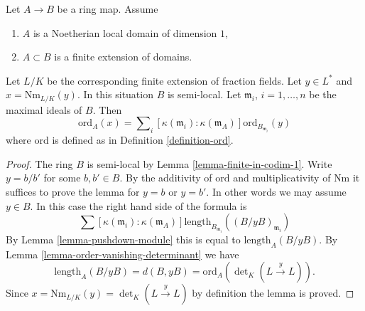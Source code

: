 \begin{lemma}
\label{lemma-finite-extension-dim-1}
Let $A \to B$ be a ring map. Assume
\begin{enumerate}
\item $A$ is a Noetherian local domain of dimension $1$,
\item $A \subset B$ is a finite extension of domains.
\end{enumerate}
Let $L/K$ be the corresponding finite extension of fraction fields.
Let $y \in L^*$ and $x = \text{Nm}_{L/K}(y)$.
In this situation $B$ is semi-local.
Let $\mathfrak m_i$, $i = 1, \ldots, n$ be the maximal ideals of $B$.
Then
$$
\text{ord}_A(x) =
\sum\nolimits_i
[\kappa(\mathfrak m_i) : \kappa(\mathfrak m_A)]
\text{ord}_{B_{\mathfrak m_i}}(y)
$$
where $\text{ord}$ is defined as in Definition \ref{definition-ord}.
\end{lemma}

\begin{proof}
The ring $B$ is semi-local by Lemma \ref{lemma-finite-in-codim-1}.
Write $y = b/b'$ for some $b, b' \in B$.
By the additivity of $\text{ord}$ and multiplicativity of
$\text{Nm}$ it suffices to prove the lemma for
$y = b$ or $y = b'$. In other words we may assume $y \in B$.
In this case the right hand side of the formula is
$$
\sum [\kappa(\mathfrak m_i) : \kappa(\mathfrak m_A)]
\text{length}_{B_{\mathfrak m_i}}((B/yB)_{\mathfrak m_i})
$$
By Lemma \ref{lemma-pushdown-module} this is equal to
$\text{length}_A(B/yB)$. By Lemma \ref{lemma-order-vanishing-determinant}
we have
$$
\text{length}_A(B/yB) = d(B, yB) =
\text{ord}_A(\det\nolimits_K(L \xrightarrow{y} L)).
$$
Since $x = \text{Nm}_{L/K}(y) = \det\nolimits_K(L \xrightarrow{y} L)$
by definition the lemma is proved.
\end{proof}














